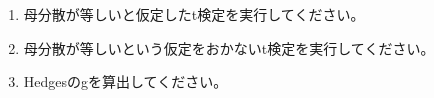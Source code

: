 \begin{enumerate}
	\item 母分散が等しいと仮定したt検定を実行してください。
	\item 母分散が等しいという仮定をおかないt検定を実行してください。
	\item Hedgesのgを算出してください。
\end{enumerate}

